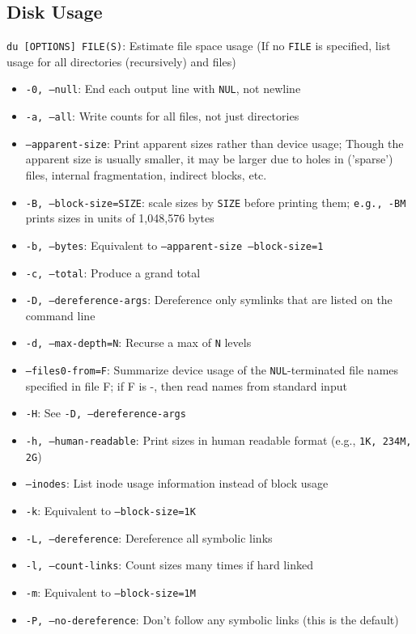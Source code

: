 \documentclass[13pt]{article}
\begin{document}
\subsection{Disk Usage}
\texttt{du [OPTIONS] FILE(S)}: Estimate file space usage (If no \texttt{FILE} is specified, list usage for all directories (recursively) and files)
\begin{itemize}[leftmargin = 0pt]
\item [] \texttt{-0, --null}: End each output line with \texttt{NUL}, not newline
\item [] \texttt{-a, --all}: Write counts for all files, not just directories
\item [] \texttt{--apparent-size}: Print apparent sizes rather than device usage; Though the apparent size is usually smaller, it may be larger due to holes in ('sparse') files, internal fragmentation, indirect blocks, etc.
\item [] \texttt{-B, --block-size=SIZE}: scale sizes by \texttt{SIZE} before printing them; \texttt{e.g., -BM} prints sizes in units of 1,048,576 bytes
\item [] \texttt{-b, --bytes}: Equivalent to \texttt{--apparent-size --block-size=1}
\item [] \texttt{-c, --total}: Produce a grand total
\item [] \texttt{-D, --dereference-args}: Dereference only symlinks that are listed on the command line
\item [] \texttt{-d, --max-depth=N}: Recurse a max of \texttt{N} levels
\item [] \texttt{--files0-from=F}: Summarize device usage of the \texttt{NUL}-terminated file names specified in file F; if F is -, then read names from standard input
\item [] \texttt{-H}: See \texttt{-D, --dereference-args}
\item [] \texttt{-h, --human-readable}: Print sizes in human readable format (e.g., \texttt{1K, 234M, 2G})
\item [] \texttt{--inodes}: List inode usage information instead of block usage
\item [] \texttt{-k}: Equivalent to \texttt{--block-size=1K}
\item [] \texttt{-L, --dereference}: Dereference all symbolic links
\item [] \texttt{-l, --count-links}: Count sizes many times if hard linked
\item [] \texttt{-m}: Equivalent to \texttt{--block-size=1M}
\item [] \texttt{-P, --no-dereference}: Don't follow any symbolic links (this is the default)

\end{itemize}
\end{document}
